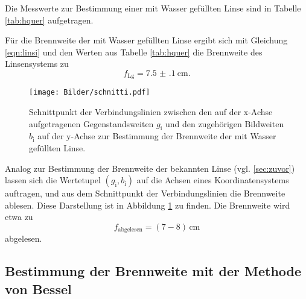 Die Messwerte zur Bestimmung einer mit Wasser gefüllten Linse sind in Tabelle \ref{tab:hquer}
aufgetragen.

Für die Brennweite der mit Wasser gefüllten Linse ergibt sich mit Gleichung \eqref{eqn:linsi}
und den Werten aus Tabelle \ref{tab:hquer} die Brennweite des Linsensystems zu
\begin{equation*}
	f_{\mathrm{Lg}} = \SI{7.5(1)}{\centi\meter} \mathrm{.}
\end{equation*}

\begin{figure}
  \centering
  \texttt{[image: Bilder/schnitti.pdf]}
  \caption{Schnittpunkt der Verbindungslinien zwischen den auf der x-Achse aufgetragenen Gegenstandsweiten $g_\mathrm{i}$ und den zugehörigen Bildweiten $b_\mathrm{i}$ auf der y-Achse zur Bestimmung der Brennweite der mit Wasser gefüllten Linse.}
  \label{fig:kopiert}
\end{figure}


Analog zur Bestimmung der Brennweite der bekannten Linse (vgl. \ref{sec:zuvor}) lassen sich
die Wertetupel $(g_{\mathrm{i}}, b_{\mathrm{i}})$ auf die Achsen eines Koordinatensystems
auftragen, und aus dem Schnittpunkt der Verbindungslinien die Brennweite ablesen.
Diese Darstellung  ist in Abbildung \ref{fig:kopiert} zu finden.
Die Brennweite wird etwa zu
\begin{equation*}
	f_{\mathrm{abgelesen}} = (7-8)\,\si{\centi\meter}
\end{equation*}
abgelesen.




\FloatBarrier
\subsection{Bestimmung der Brennweite mit der Methode von Bessel}
